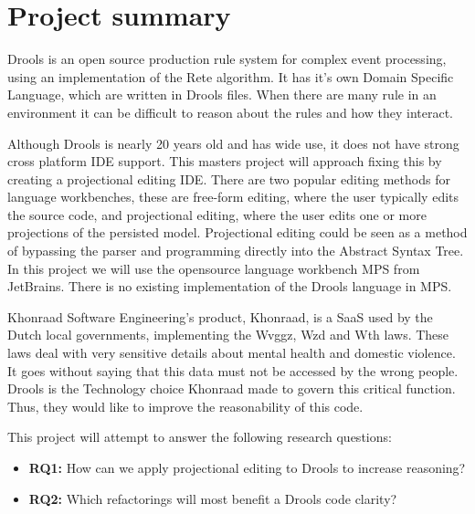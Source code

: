\section{Project summary}
Drools is an open source production rule system for complex event processing, using an implementation of the Rete algorithm.
It has it's own Domain Specific Language, which are written in Drools files.
When there are many rule in an environment it can be difficult to reason about the rules and how they interact.


Although Drools is nearly 20 years old and has wide use, it does not have strong cross platform IDE support.
This masters project will approach fixing this by creating a projectional editing IDE.
There are two popular editing methods for language workbenches, these are free-form editing, where the user typically edits the source code, and projectional editing,
where the user edits one or more projections of the persisted model\cite{erdweg2013state}.
Projectional editing could be seen as a method of bypassing the parser and programming directly into the Abstract Syntax Tree.
In this project we will use the opensource language workbench MPS from JetBrains\cite{MPS_ProductPage}.
There is no existing implementation of the Drools language in MPS.


Khonraad Software Engineering's product, Khonraad, is a SaaS used by the Dutch local governments, implementing the Wvggz, Wzd and Wth laws. 
These laws deal with very sensitive details about mental health and domestic violence.
It goes without saying that this data must not be accessed by the wrong people.
Drools is the Technology choice Khonraad made to govern this critical function.
Thus, they would like to improve the reasonability of this code.



This project will attempt to answer the following research questions:
\begin{itemize}
    \item \textbf{RQ1:} How can we apply projectional editing to Drools to increase reasoning?  
    \item \textbf{RQ2:} Which refactorings will most benefit a Drools code clarity?
\end{itemize}